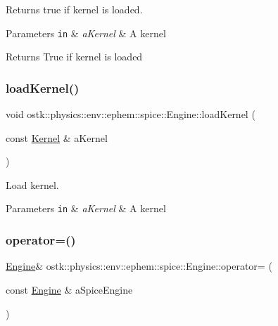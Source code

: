 Returns true if kernel is loaded. 


\begin{DoxyParams}[1]{Parameters}
\mbox{\tt in}  & {\em a\+Kernel} & A kernel \\
\hline
\end{DoxyParams}
\begin{DoxyReturn}{Returns}
True if kernel is loaded 
\end{DoxyReturn}
\mbox{\label{classostk_1_1physics_1_1env_1_1ephem_1_1spice_1_1_engine_aa1aa0d1e376b18899c603950a2d43589}} 
\subsubsection{\texorpdfstring{load\+Kernel()}{loadKernel()}}
{\footnotesize\ttfamily void ostk\+::physics\+::env\+::ephem\+::spice\+::\+Engine\+::load\+Kernel (\begin{DoxyParamCaption}\item[{const \hyperlink{classostk_1_1physics_1_1env_1_1ephem_1_1spice_1_1_kernel}{Kernel} \&}]{a\+Kernel }\end{DoxyParamCaption})}



Load kernel. 


\begin{DoxyParams}[1]{Parameters}
\mbox{\tt in}  & {\em a\+Kernel} & A kernel \\
\hline
\end{DoxyParams}
\mbox{\label{classostk_1_1physics_1_1env_1_1ephem_1_1spice_1_1_engine_a807af40bbe562341a66abb875fa3ab9f}} 
\subsubsection{\texorpdfstring{operator=()}{operator=()}}
{\footnotesize\ttfamily \hyperlink{classostk_1_1physics_1_1env_1_1ephem_1_1spice_1_1_engine}{Engine}\& ostk\+::physics\+::env\+::ephem\+::spice\+::\+Engine\+::operator= (\begin{DoxyParamCaption}\item[{const \hyperlink{classostk_1_1physics_1_1env_1_1ephem_1_1spice_1_1_engine}{Engine} \&}]{a\+Spice\+Engine }\end{DoxyParamCaption})\hspace{0.3cm}{\ttfamily [delete]}}



